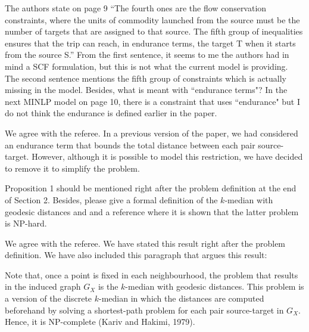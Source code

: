 \documentclass{article}
\newenvironment{reviewer}{\setcounter{pointcounter}{1}}{}
\newcommand{\point}{\text{{\selectfont \thepointcounter} \stepcounter{pointcounter}}}
\begin{document}
\begin{reviewer}
		\begin{itshape}
			The authors state on page 9 ``The fourth ones are the flow conservation constraints, where the units of commodity launched from the source must be the number of targets that are assigned to that source. The fifth group of inequalities ensures that the trip can reach, in endurance terms, the target T when it starts from the source S.'' From the first sentence, it seems to me the authors had in mind a SCF formulation, but this is not what the current model is providing. The second sentence mentions the fifth group of constraints which is actually missing in the model. Besides, what is meant with ``endurance terms"? In the next MINLP model on page 10, there is a constraint that uses ``endurance" but I do not think the endurance is defined earlier in the paper.
		\end{itshape}
		
		\begin{tcolorbox}[breakable,enhanced,coltitle=black,colback=green!5!white,colframe=green!75!black,title=\textbf{Answer R2.\point},borderline={1pt}{0pt}{black},boxrule=0pt]
			We agree with the referee. In a previous version of the paper, we had considered an endurance term that bounds the total distance between each pair source-target. However, although it is possible to model this restriction, we have decided to remove it to simplify the problem.
		\end{tcolorbox}
		
		\begin{itshape}
			Proposition 1 should be mentioned right after the problem definition at the end of Section 2. Besides, please give a formal definition of the $k$-median with geodesic distances and and a reference where it is shown that the latter problem is NP-hard.
		\end{itshape}
		
		\begin{tcolorbox}[breakable,enhanced,coltitle=black,colback=green!5!white,colframe=green!75!black,title=\textbf{Answer R2.\point},borderline={1pt}{0pt}{black},boxrule=0pt]
			We agree with the referee. We have stated this result right after the problem definition. We have also included this paragraph that argues this result:
			
			\medskip
			
			Note that, once a point is fixed in each neighbourhood, the problem that results in the induced graph $G_X$ is the $k$-median with geodesic distances. This problem is a version of the discrete $k$-median in which the distances are computed beforehand by solving a shortest-path problem for each pair source-target in $G_X$. Hence, it is NP-complete (Kariv and Hakimi, 1979).
		\end{tcolorbox}
		


\end{reviewer}
\end{document}
